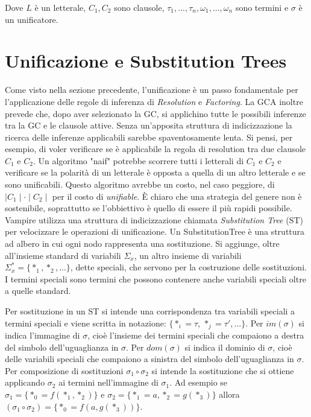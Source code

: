 \documentclass[./main.tex]{subfiles}
\begin{document}
Dove $L$ è un letterale, $C_1, C_2$ sono clausole, $\tau_1, ..., \tau_n, \omega_1, ..., \omega_n$ sono termini e $\sigma$ è un unificatore.

\section{Unificazione e Substitution Trees} \label{sec:vampire_unification}
Come visto nella sezione precedente, l'unificazione è un passo fondamentale per l'applicazione delle regole di inferenza di 
\textit{Resolution} e \textit{Factoring}. La GCA inoltre prevede che, dopo aver selezionato la GC, 
si applichino tutte le possibili inferenze tra la GC e le clausole attive. 
Senza un'apposita struttura di indicizzazione la ricerca delle inferenze applicabili sarebbe spaventosamente lenta.
Si pensi, per esempio, di voler verificare se è applicabile la regola di resolution tra due clausole $C_1$ e $C_2$.
Un algoritmo "naif" potrebbe scorrere tutti i letterali di $C_1$ e $C_2$ e verificare se 
la polarità di un letterale è opposta a quella di un altro letterale e se sono unificabili. 
Questo algoritmo avrebbe un costo, nel caso peggiore, di $\mid C_1 \mid \cdot \mid C_2 \mid$ per il costo di \textit{unifiable}.
È chiaro che una strategia del genere non è sostenibile, soprattutto se l'obbiettivo è quello di essere il più rapidi possibile.
Vampire utilizza una struttura di indicizzazione chiamata \textit{Substitution Tree} (ST) per velocizzare le operazioni di unificazione.
Un SubstitutionTree è una struttura ad albero in cui ogni nodo rappresenta una sostituzione.
Si aggiunge, oltre all'insieme standard di variabili $\Sigma_x$, un altro insieme di variabili $\Sigma_x^* = \{*_1, *_2, ...\}$, dette speciali, che servono per la costruzione delle sostituzioni.
I termini speciali sono termini che possono contenere anche variabili speciali oltre a quelle standard.

Per sostituzione in un ST si intende una corrispondenza tra variabili speciali a termini speciali e viene scritta in notazione:
$\{*_i = \tau$, $*_j = \tau', ... \}$. 
Per $im(\sigma)$ si indica l'immagine di $\sigma$, cioè l'insieme dei termini speciali che compaiono a destra del simbolo dell'uguaglianza in $\sigma$.
Per $dom(\sigma)$ si indica il dominio di $\sigma$, cioè delle variabili speciali che compaiono a sinistra del simbolo dell'uguaglianza in $\sigma$.
Per composizione di sostituzioni $\sigma_1 \circ \sigma_2$ si intende la sostituzione che si ottiene applicando $\sigma_2$ 
ai termini nell'immagine di $\sigma_1$. Ad esempio se $\sigma_1 = \{*_0 = f(*_1, *_2)\}$ e $\sigma_2 = \{*_1 = a, *_2 = g(*_3)\}$ allora
$(\sigma_1 \circ \sigma_2) = \{*_0 = f(a, g(*_3))\}$.
\end{document}
